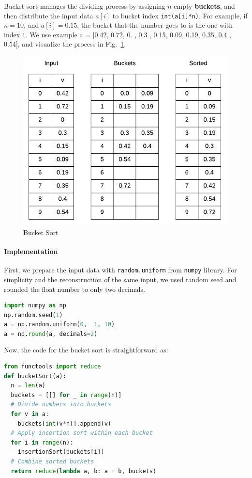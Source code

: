 \documentclass[../main.tex]{subfiles}
\begin{document}
Bucket sort manages the dividing process by assigning $n$ empty \textbf{buckets}, and then distribute the input data $a[i]$ to bucket index \texttt{int(a[i]*n)}. For example, if $n=10$, and $a[i]=0.15$, the bucket that the number goes to is the one with index $1$. We use example a = [0.42, 0.72, 0.  , 0.3 , 0.15, 0.09, 0.19, 0.35, 0.4 , 0.54], and visualize the process in Fig.~\ref{fig:bucket_sort}. 
\begin{figure}[!ht]
    \centering

    \includegraphics[width=0.8\columnwidth]{fig/bucket_sort.png}
    \caption{Bucket Sort}
        \label{fig:bucket_sort}
\end{figure}


\paragraph{Implementation} First, we prepare the input data with \texttt{random.uniform} from \texttt{numpy} library. For simplicity and the reconstruction of the same input, we used random seed and rounded the float number to only two decimals.
\begin{lstlisting}[language=Python]
import numpy as np
np.random.seed(1)
a = np.random.uniform(0,  1, 10)
a = np.round(a, decimals=2)
\end{lstlisting}
Now, the code for the bucket sort is straightforward as:
\begin{lstlisting}[language=Python]
from functools import reduce
def bucketSort(a):
  n = len(a)
  buckets = [[] for _ in range(n)]
  # Divide numbers into buckets
  for v in a:
    buckets[int(v*n)].append(v)
  # Apply insertion sort within each bucket
  for i in range(n):
    insertionSort(buckets[i])
  # Combine sorted buckets
  return reduce(lambda a, b: a + b, buckets)
\end{lstlisting}
\end{document}
